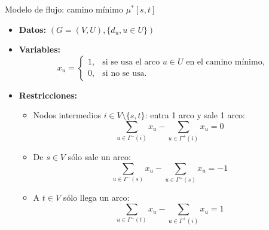 \documentclass[aspectratio=169]{beamer}
\begin{document}
\begin{frame}{Modelo de flujo: camino mínimo $\mu^*[s,t]$}
   
\begin{itemize}
    \item {\bf Datos:} $(G=(V,U), \{ d_u, u \in U \} )$
    \item {\bf Variables:}
	$$x_{u} = \begin{cases}1, & \textrm{si se usa el arco $u\in U$ en el camino mínimo,}
    \\
    0, & \textrm{si no se usa.}  
    \end{cases}$$
    \item {\bf Restricciones:}
     \begin{itemize}
      \item Nodos intermedios $i\in V\setminus\{s,t\}$: entra 1 arco y sale 1 arco:
         $$
     \sum_{u\in \Gamma^-(i)} x_u - \sum_{u\in \Gamma^+(i)} x_u=0
     $$
         \item De $s\in V$ sólo sale un arco:
         $$
     \sum_{u\in \Gamma^-(s)} x_u - \sum_{u\in \Gamma^+(s)} x_u=-1
     $$
         \item A $t\in V$ sólo llega un arco:
         $$
     \sum_{u\in \Gamma^-(t)} x_u - \sum_{u\in \Gamma^+(i)} x_u=1
     $$       
     \end{itemize}   

\end{itemize}


\end{frame}

\end{document}
